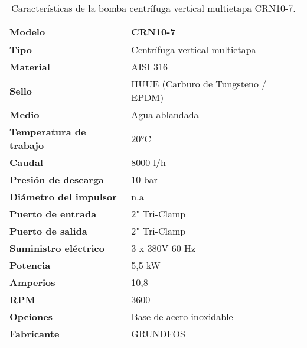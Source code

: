 \begin{table}[H]
    \centering
    \caption{Características de la bomba centrífuga vertical multietapa CRN10-7.}
    \label{table:bomba_centrifuga}
    \begin{tabular}{| L{6cm} | L{6cm} |}
        \hline
        \textbf{Modelo}                 & CRN10-7                            \\
        \hline
        \textbf{Tipo}                   & Centrífuga vertical multietapa     \\
        \hline
        \textbf{Material}               & AISI 316                           \\
        \hline
        \textbf{Sello}                  & HUUE (Carburo de Tungsteno / EPDM) \\
        \hline
        \textbf{Medio}                  & Agua ablandada                     \\
        \hline
        \textbf{Temperatura de trabajo} & 20°C                               \\
        \hline
        \textbf{Caudal}                 & 8000 l/h                           \\
        \hline
        \textbf{Presión de descarga}    & 10 bar                             \\
        \hline
        \textbf{Diámetro del impulsor}  & n.a                                \\
        \hline
        \textbf{Puerto de entrada}      & 2" Tri-Clamp                       \\
        \hline
        \textbf{Puerto de salida}       & 2" Tri-Clamp                       \\
        \hline
        \textbf{Suministro eléctrico}   & 3 x 380V 60 Hz                     \\
        \hline
        \textbf{Potencia}               & 5,5 kW                             \\
        \hline
        \textbf{Amperios}               & 10,8                               \\
        \hline
        \textbf{RPM}                    & 3600                               \\
        \hline
        \textbf{Opciones}               & Base de acero inoxidable           \\
        \hline
        \textbf{Fabricante}             & GRUNDFOS                           \\
        \hline
    \end{tabular}
\end{table}



